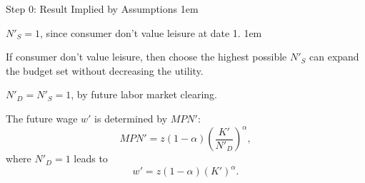 \documentclass[11pt,aspectratio=43]{beamer}
\let\olditemize=\itemize
\let\endolditemize=\enditemize
\renewenvironment{itemize}{\olditemize \itemsep1em}{\endolditemize}
\let\oldenumerate=\enumerate
\let\endoldenumerate=\endenumerate
\renewenvironment{enumerate}{\oldenumerate \itemsep1em}{ \endoldenumerate}
\theoremstyle{definition}
\begin{document}
\begin{frame}{Step 0: Result Implied by Assumptions}
\label{slide:Step_0__Result_Implied_by_Assumptions}
    \begin{enumerate}
        \item $ N'_{S} = 1 $, since consumer don't value leisure at date 1.
        \begin{itemize}
            \item If consumer don't value leisure, then choose the highest possible $ N'_{S} $ can expand the budget set without decreasing the utility.
        \end{itemize}
        \item $ N'_{D} = N'_{S} = 1 $, by future labor market clearing.
        \item The future wage $ w' $ is determined by $ MPN' $:
        \begin{equation*}
            MPN' = z ( 1-\alpha ) \left(
                \frac{K'}{N'_{D}}
            \right)^{\alpha}
        ,\end{equation*}
        where $ N'_{D} = 1 $ leads to
        \begin{equation*}
            w' = z ( 1-\alpha ) ( K' )^{\alpha}
        .\end{equation*}
    \end{enumerate}
\end{frame}
\end{document}
